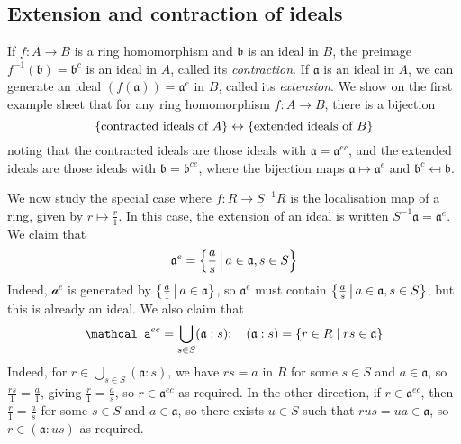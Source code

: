 \subsection{Extension and contraction of ideals}
If \( f : A \to B \) is a ring homomorphism and \( \mathfrak b \) is an ideal in \( B \), the preimage \( f^{-1}(\mathfrak b) = \mathfrak b^c \) is an ideal in \( A \), called its \emph{contraction}.
If \( \mathfrak a \) is an ideal in \( A \), we can generate an ideal \( (f(\mathfrak a)) = \mathfrak a^e \) in \( B \), called its \emph{extension}.
We show on the first example sheet that for any ring homomorphism \( f : A \to B \), there is a bijection
\[ \qty{\text{contracted ideals of } A} \leftrightarrow \qty{\text{extended ideals of } B} \]
noting that the contracted ideals are those ideals with \( \mathfrak a = \mathfrak a^{ec} \), and the extended ideals are those ideals with \( \mathfrak b = \mathfrak b^{ce} \), where the bijection maps \( \mathfrak a \mapsto \mathfrak a^e \) and \( \mathfrak b^c \mapsfrom \mathfrak b \).

We now study the special case where \( f : R \to S^{-1}R \) is the localisation map of a ring, given by \( r \mapsto \frac{r}{1} \).
In this case, the extension of an ideal is written \( S^{-1}\mathfrak a = \mathfrak a^e \).
We claim that
\[ \mathfrak a^e = \qty{\frac{a}{s} \,\middle|\,a \in \mathfrak a, s \in S} \]
Indeed, \( \mathcal a^e \) is generated by \( \qty{\frac{a}{1} \,\middle|\,a \in \mathfrak a} \), so \( \mathfrak a^e \) must contain \( \qty{\frac{a}{s} \,\middle|\,a \in \mathfrak a, s \in S} \), but this is already an ideal.
We also claim that
\[ \mathcal a^{ec} = \bigcup_{s \in S} (\mathfrak a : s);\quad (\mathfrak a : s) = \qty{r \in R \mid rs \in \mathfrak a} \]
Indeed, for \( r \in \bigcup_{s \in S} (\mathfrak a : s) \), we have \( rs = a \) in \( R \) for some \( s \in S \) and \( a \in \mathfrak a \), so \( \frac{rs}{1} = \frac{a}{1} \), giving \( \frac{r}{1} = \frac{a}{s} \), so \( r \in \mathfrak a^{ec} \) as required.
In the other direction, if \( r \in \mathfrak a^{ec} \), then \( \frac{r}{1} = \frac{a}{s} \) for some \( s \in S \) and \( a \in \mathfrak a \), so there exists \( u \in S \) such that \( rus = ua \in \mathfrak a \), so \( r \in (\mathfrak a : us) \) as required.

